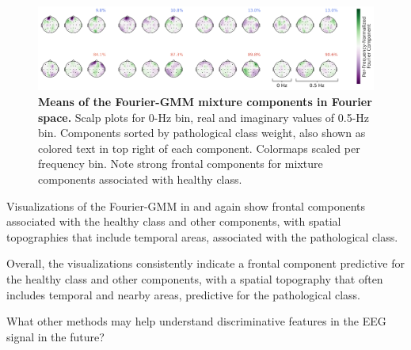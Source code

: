 \begin{figure}[h!tb]
    \myfloatalign
    \includegraphics[width=1\linewidth]{images/low-freq-gmm-prototypes-scaled-per-freq-with-class-color-and-bar.png}
    \caption[Fourier-GMM means in Fourier space]{
\textbf{Means of the Fourier-GMM mixture components in Fourier space.}
Scalp plots for 0-Hz bin, real and imaginary values of 0.5-Hz bin.
Components sorted by pathological class weight, also shown as colored
text in top right of each component. Colormaps scaled per frequency bin.
Note strong frontal components for mixture components associated with
healthy class.
}
\label{fourier-gmm-low-freq-fig}
\end{figure}

Visualizations of the Fourier-GMM in
 and  again show frontal
components associated with the healthy class and other components, with
spatial topographies that include temporal areas, associated with the
pathological class.

    Overall, the visualizations consistently indicate a frontal component
predictive for the healthy class and other components, with a spatial
topography that often includes temporal and nearby areas, predictive for
the pathological class.

\begin{openbox}
\item What other methods may help understand discriminative features in the EEG signal in the future?
\end{openbox}

